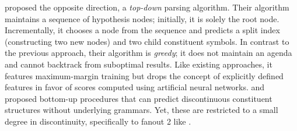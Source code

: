 \documentclass[../document.tex]{subfiles}
\begin{document}
     proposed the opposite direction, a \emph{top-down} parsing algorithm.
        Their algorithm maintains a sequence of hypothesis nodes; initially, it is solely the root node.
        Incrementally, it chooses a node from the sequence and predicts a split index (constructing two new nodes) and two child constituent symbols.
    In contrast to the previous approach, their algorithm is \emph{greedy}; it does not maintain an agenda and cannot backtrack from suboptimal results.
    Like existing approaches, it features maximum-margin training but drops the concept of explicitly defined features in favor of scores computed using artificial neural networks.
     and \citet{StaSte20} proposed bottom-up procedures that can predict discontinuous constituent structures without underlying grammars.
    Yet, these are restricted to a small degree in discontinuity, specifically to fanout 2 like .
\end{document}
